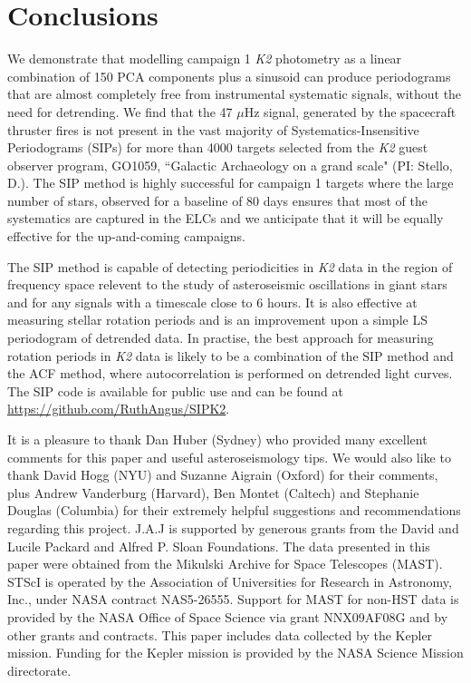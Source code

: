 \documentclass[useAMS, usenatbib, preprint, 12pt]{aastex}
\begin{document}
\section{Conclusions}
\label{sec:conclusions}
We demonstrate that modelling campaign 1 {\it K2} photometry as a linear
combination of 150 PCA components plus a sinusoid can produce periodograms
that are almost completely free from instrumental systematic signals, without
the need for detrending.
We find that the 47 $\mu$Hz signal, generated by the spacecraft thruster
fires is not present in the vast majority of Systematics-Insensitive
Periodograms (SIPs) for more than 4000 targets
selected from the {\it K2} guest observer program, GO1059, ``Galactic
Archaeology on a grand scale" (PI: Stello, D.).
The SIP method is highly successful for campaign 1 targets where the large
number of stars, observed for a baseline of 80 days ensures that most of the
systematics are captured in the ELCs and we anticipate that it will
be equally effective for the up-and-coming campaigns.

The SIP method is capable of detecting periodicities in {\it K2} data in the
region of frequency space relevent to the study of asteroseismic oscillations
in giant stars and for any signals with a timescale close to 6 hours.
It is also effective at measuring stellar rotation periods and is an
improvement upon a simple LS periodogram of detrended data.
In practise, the best approach for measuring rotation periods in {\it K2} data
is likely to be a combination of the SIP method and the ACF method, where
autocorrelation is performed on detrended light curves.
The SIP code is available for public use and can be found at
\url{https://github.com/RuthAngus/SIPK2}.

It is a pleasure to thank Dan Huber (Sydney) who provided many excellent
comments for this paper and useful asteroseismology tips.
We would also like to thank David Hogg (NYU) and Suzanne Aigrain (Oxford)
for their comments, plus Andrew Vanderburg (Harvard), Ben Montet (Caltech)
and Stephanie Douglas (Columbia) for their extremely helpful suggestions and recommendations regarding this project.
J.A.J is supported by generous grants from the David and Lucile Packard and
Alfred P. Sloan Foundations.
The data presented in this paper were obtained from the Mikulski Archive for
Space Telescopes (MAST).
STScI is operated by the Association of Universities for Research in Astronomy,
Inc., under NASA contract NAS5-26555.
Support for MAST for non-HST data is provided by the NASA Office of Space
Science via grant NNX09AF08G and by other grants and contracts.
This paper includes data collected by the Kepler mission.
Funding for the Kepler mission is provided by the NASA Science Mission
directorate.



\end{document}
